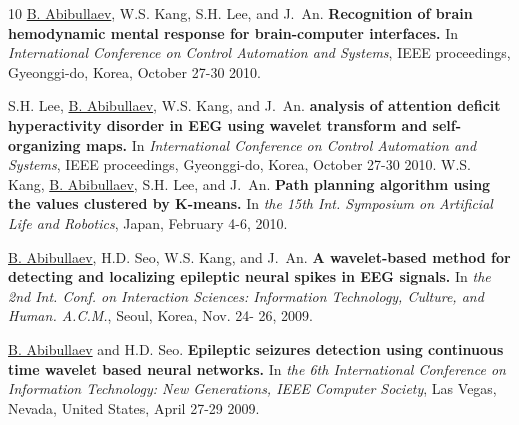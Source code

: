 \documentclass[10pt,letterpaper,sans]{moderncv}   %
\begin{document}
\begin{thebibliography}{10}
\underline{B. Abibullaev}, W.S. Kang, S.H. Lee, and J.~An.
\newblock \textbf{Recognition of brain hemodynamic mental response for brain-computer interfaces.}
\newblock In {\em International Conference on Control Automation and Systems}, IEEE proceedings,  Gyeonggi-do, Korea, October 27-30 2010.

S.H. Lee, \underline{B. Abibullaev}, W.S. Kang, and J.~An.
\newblock \textbf{analysis of attention deficit hyperactivity disorder in {EEG} using wavelet transform and self-organizing maps.}
\newblock In {\em International Conference on Control Automation and Systems}, IEEE proceedings, Gyeonggi-do, Korea, October 27-30 2010.
%
W.S. Kang, \underline{B. Abibullaev}, S.H. Lee, and J.~An.
\newblock \textbf{Path planning algorithm using the values clustered by K-means.}
\newblock In {\em the 15th Int. Symposium on Artificial Life and Robotics}, Japan, February 4-6, 2010.

\underline{B. Abibullaev}, H.D. Seo, W.S. Kang, and J.~An.
\newblock \textbf{A wavelet-based method for detecting and localizing epileptic neural spikes in {EEG} signals.}
\newblock In {\em the 2nd Int. Conf. on Interaction Sciences: Information Technology, Culture, and Human. A.C.M.}, Seoul, Korea,  Nov. 24- 26, 2009.

\underline{B. Abibullaev} and H.D. Seo.
\newblock \textbf{Epileptic seizures detection using continuous time wavelet based neural networks.}
\newblock In {\em the 6th International Conference on Information Technology: New Generations, IEEE Computer Society}, Las Vegas, Nevada, United States, April 27-29 2009.

\end{thebibliography}
\vspace{10pt}
 
\end{document}
